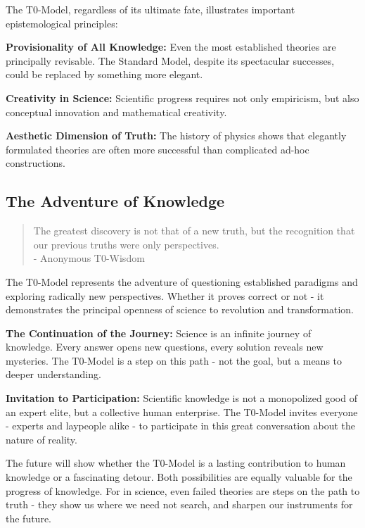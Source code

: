 \documentclass[12pt,a4paper]{report}
\begin{document}
	The T0-Model, regardless of its ultimate fate, illustrates important epistemological principles:
	
	\textbf{Provisionality of All Knowledge:}
	Even the most established theories are principally revisable. The Standard Model, despite its spectacular successes, could be replaced by something more elegant.
	
	\textbf{Creativity in Science:}
	Scientific progress requires not only empiricism, but also conceptual innovation and mathematical creativity.
	
	\textbf{Aesthetic Dimension of Truth:}
	The history of physics shows that elegantly formulated theories are often more successful than complicated ad-hoc constructions.
	
	\subsection{The Adventure of Knowledge}\label{subsec:adventure_knowledge}
	
	\begin{quote}
		The greatest discovery is not that of a new truth, but the recognition that our previous truths were only perspectives. \\
		\hfill - Anonymous T0-Wisdom
	\end{quote}
	
	The T0-Model represents the adventure of questioning established paradigms and exploring radically new perspectives. Whether it proves correct or not - it demonstrates the principal openness of science to revolution and transformation.
	
	\textbf{The Continuation of the Journey:}
	Science is an infinite journey of knowledge. Every answer opens new questions, every solution reveals new mysteries. The T0-Model is a step on this path - not the goal, but a means to deeper understanding.
	
	\textbf{Invitation to Participation:}
	Scientific knowledge is not a monopolized good of an expert elite, but a collective human enterprise. The T0-Model invites everyone - experts and laypeople alike - to participate in this great conversation about the nature of reality.
	
	The future will show whether the T0-Model is a lasting contribution to human knowledge or a fascinating detour. Both possibilities are equally valuable for the progress of knowledge. For in science, even failed theories are steps on the path to truth - they show us where we need not search, and sharpen our instruments for the future.
	
\end{document}
